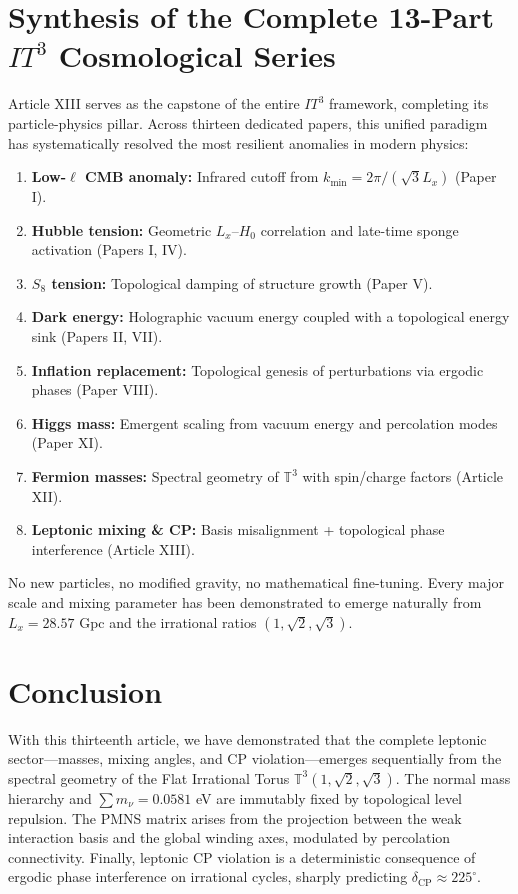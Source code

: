 \documentclass[12pt,a4paper]{article}
\begin{document}
\section{Synthesis of the Complete 13-Part $IT^3$ Cosmological Series}

Article XIII serves as the capstone of the entire $IT^3$ framework, completing its particle-physics pillar. Across thirteen dedicated papers, this unified paradigm has systematically resolved the most resilient anomalies in modern physics:
\begin{enumerate}
    \item \textbf{Low-$\ell$ CMB anomaly:} Infrared cutoff from $k_{\min} = 2\pi/(\sqrt{3}L_x)$ (Paper I).
    \item \textbf{Hubble tension:} Geometric $L_x$--$H_0$ correlation and late-time sponge activation (Papers I, IV).
    \item \textbf{$S_8$ tension:} Topological damping of structure growth (Paper V).
    \item \textbf{Dark energy:} Holographic vacuum energy coupled with a topological energy sink (Papers II, VII).
    \item \textbf{Inflation replacement:} Topological genesis of perturbations via ergodic phases (Paper VIII).
    \item \textbf{Higgs mass:} Emergent scaling from vacuum energy and percolation modes (Paper XI).
    \item \textbf{Fermion masses:} Spectral geometry of $\mathbb{T}^3$ with spin/charge factors (Article XII).
    \item \textbf{Leptonic mixing \& CP:} Basis misalignment + topological phase interference (Article XIII).
\end{enumerate}
No new particles, no modified gravity, no mathematical fine-tuning. Every major scale and mixing parameter has been demonstrated to emerge naturally from $L_x = 28.57$ Gpc and the irrational ratios $(1, \sqrt{2}, \sqrt{3})$.

\section{Conclusion}
With this thirteenth article, we have demonstrated that the complete leptonic sector---masses, mixing angles, and CP violation---emerges sequentially from the spectral geometry of the Flat Irrational Torus $\mathbb{T}^3(1,\sqrt{2},\sqrt{3})$. The normal mass hierarchy and $\sum m_\nu = 0.0581$ eV are immutably fixed by topological level repulsion. The PMNS matrix arises from the projection between the weak interaction basis and the global winding axes, modulated by percolation connectivity. Finally, leptonic CP violation is a deterministic consequence of ergodic phase interference on irrational cycles, sharply predicting $\delta_{\text{CP}} \approx 225^\circ$.
\end{document}
